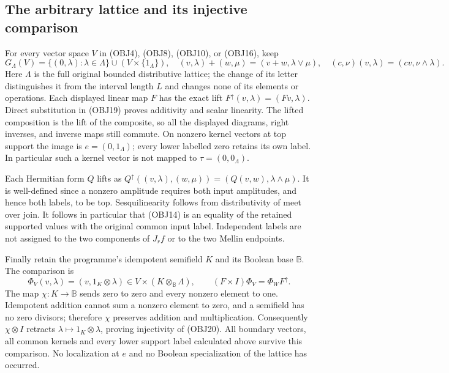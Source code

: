 \subsection{The arbitrary lattice and its injective comparison}

For every vector space $V$ in (OBJ4), (OBJ8), (OBJ10), or (OBJ16), keep
\begin{equation}\tag{OBJ19}
 G_\Lambda(V)=\{(0,\lambda):\lambda\in\Lambda\}
       \cup(V\times\{1_\Lambda\}),\quad
 (v,\lambda)+(w,\mu)=(v+w,\lambda\vee\mu),\quad
 (c,\nu)(v,\lambda)=(cv,\nu\wedge\lambda).
\end{equation}
Here $\Lambda$ is the full original bounded distributive lattice;
the change of its letter distinguishes it from the interval length
$L$ and changes none of its elements or operations. Each displayed
linear map $F$ has the exact lift $F^\uparrow(v,\lambda)=(Fv,\lambda)$.
Direct substitution in (OBJ19) proves additivity and scalar linearity.
The lifted composition is the lift of the composite, so all the
displayed diagrams, right inverses, and inverse maps still commute.
On nonzero kernel vectors at top support the image is
$e=(0,1_\Lambda)$; every lower labelled zero retains its own label.
In particular such a kernel vector is not mapped to
$\tau=(0,0_\Lambda)$.

Each Hermitian form $Q$ lifts as
$Q^\uparrow((v,\lambda),(w,\mu))=(Q(v,w),\lambda\wedge\mu)$.
It is well-defined since a nonzero amplitude requires both input
amplitudes, and hence both labels, to be top. Sesquilinearity follows
from distributivity of meet over join. It follows in particular that
(OBJ14) is an equality of the retained supported values with the
original common input label. Independent labels are not assigned to
the two components of $J_rf$ or to the two Mellin endpoints.

Finally retain the programme's idempotent semifield $K$ and its
Boolean base $\mathbb B$. The comparison is
\begin{equation}\tag{OBJ20}
 \Phi_V(v,\lambda)=(v,1_K\otimes\lambda)
 \in V\times(K\otimes_{\mathbb B}\Lambda),\qquad
 (F\times I)\Phi_V=\Phi_WF^\uparrow.
\end{equation}
The map $\chi:K\to\mathbb B$ sends zero to zero and every nonzero
element to one. Idempotent addition cannot sum a nonzero element to
zero, and a semifield has no zero divisors; therefore $\chi$ preserves
addition and multiplication. Consequently $\chi\otimes I$ retracts
$\lambda\mapsto1_K\otimes\lambda$, proving injectivity of (OBJ20).
All boundary vectors, all common kernels and every lower support
label calculated above survive this comparison. No localization at
$e$ and no Boolean specialization of the lattice has occurred.
